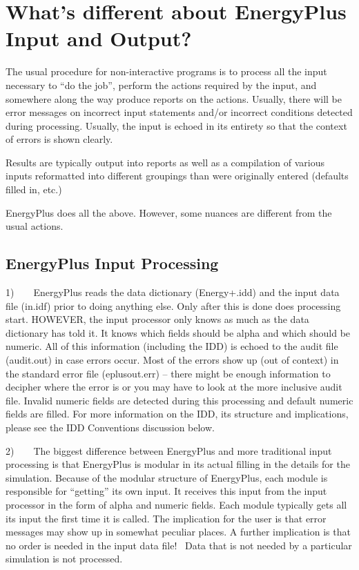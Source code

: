 \section{What's different about EnergyPlus Input and Output?}\label{whats-different-about-energyplus-input-and-output}

The usual procedure for non-interactive programs is to process all the input necessary to ``do the job'', perform the actions required by the input, and somewhere along the way produce reports on the actions. Usually, there will be error messages on incorrect input statements and/or incorrect conditions detected during processing. Usually, the input is echoed in its entirety so that the context of errors is shown clearly.

Results are typically output into reports as well as a compilation of various inputs reformatted into different groupings than were originally entered (defaults filled in, etc.)

EnergyPlus does all the above. However, some nuances are different from the usual actions.

\subsection{EnergyPlus Input Processing}\label{energyplus-input-processing}

1)~~~~EnergyPlus reads the data dictionary (Energy+.idd) and the input data file (in.idf) prior to doing anything else. Only after this is done does processing start. HOWEVER, the input processor only knows as much as the data dictionary has told it. It knows which fields should be alpha and which should be numeric. All of this information (including the IDD) is echoed to the audit file (audit.out) in case errors occur. Most of the errors show up (out of context) in the standard error file (eplusout.err) -- there might be enough information to decipher where the error is or you may have to look at the more inclusive audit file. Invalid numeric fields are detected during this processing and default numeric fields are filled. For more information on the IDD, its structure and implications, please see the IDD Conventions discussion below.

2)~~~~The biggest difference between EnergyPlus and more traditional input processing is that EnergyPlus is modular in its actual filling in the details for the simulation. Because of the modular structure of EnergyPlus, each module is responsible for ``getting'' its own input. It receives this input from the input processor in the form of alpha and numeric fields. Each module typically gets all its input the first time it is called. The implication for the user is that error messages may show up in somewhat peculiar places. A further implication is that no order is needed in the input data file!~ Data that is not needed by a particular simulation is not processed.

